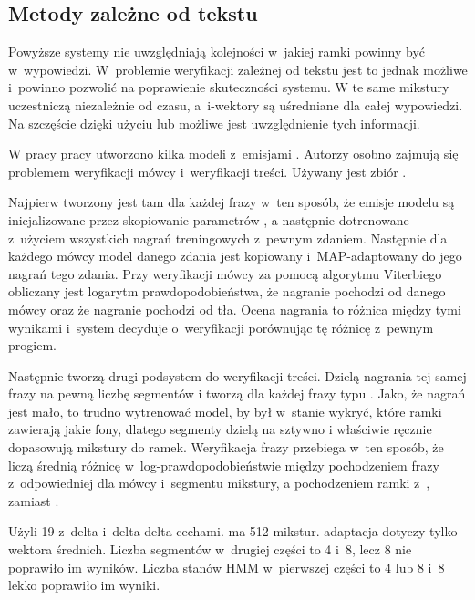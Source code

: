 
\subsection{Metody zależne od tekstu}

Powyższe systemy nie uwzględniają kolejności w~jakiej ramki powinny być w~wypowiedzi. W~problemie weryfikacji
zależnej od tekstu jest to jednak możliwe i~powinno pozwolić na poprawienie skuteczności systemu.
W  te same mikstury uczestniczą niezależnie od czasu, a~i-wektory są uśredniane dla całej
wypowiedzi. Na szczęście dzięki użyciu  lub  możliwe jest uwzględnienie tych
informacji\cite{parallelSpeakerAnd}.

W pracy \cite{parallelSpeakerAnd}
pracy utworzono kilka modeli  z~emisjami . Autorzy osobno
zajmują się problemem weryfikacji mówcy i~weryfikacji treści. Używany jest zbiór .

Najpierw tworzony jest tam  dla każdej frazy w~ten sposób, że emisje modelu są inicjalizowane przez
skopiowanie parametrów ,
a następnie dotrenowane z~użyciem wszystkich nagrań treningowych z~pewnym zdaniem.
Następnie dla każdego mówcy model danego zdania jest kopiowany i~MAP-adaptowany do jego nagrań tego zdania.
Przy weryfikacji mówcy za pomocą algorytmu Viterbiego obliczany jest logarytm
prawdopodobieństwa, że nagranie pochodzi od danego mówcy oraz że nagranie pochodzi od  tła.
Ocena nagrania to różnica między tymi wynikami i~system decyduje o~weryfikacji porównując tę różnicę z~pewnym progiem.

Następnie tworzą drugi podsystem do weryfikacji treści. Dzielą nagrania tej samej frazy na pewną liczbę segmentów
i tworzą dla każdej frazy  typu . Jako, że nagrań jest mało, to trudno
wytrenować model, by był w~stanie wykryć, które ramki zawierają jakie fony, dlatego segmenty dzielą na sztywno
i właściwie ręcznie dopasowują mikstury do ramek. Weryfikacja frazy przebiega w~ten sposób, że liczą średnią
różnicę w~log-prawdopodobieństwie między pochodzeniem frazy z~odpowiedniej dla mówcy i~segmentu mikstury, a
pochodzeniem ramki z~, zamiast .

Użyli 19  z~delta i~delta-delta cechami.  ma 512 mikstur.  adaptacja
dotyczy tylko wektora średnich. Liczba segmentów w~drugiej części to 4 i~8, lecz 8 nie poprawiło im wyników. Liczba
stanów HMM w~pierwszej części to 4 lub 8 i~8 lekko poprawiło im wyniki.

